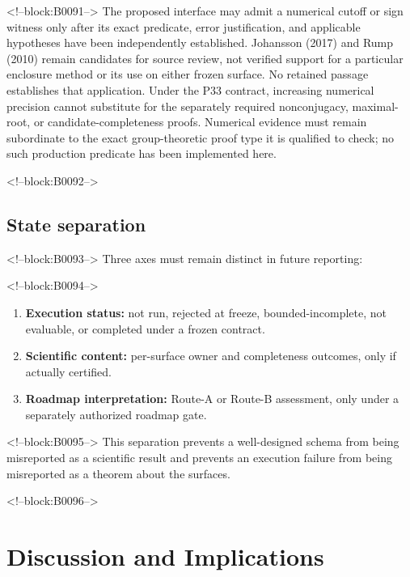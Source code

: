 \documentclass[11pt,a4paper]{article}
\providecommand{\tightlist}{\setlength{\itemsep}{0pt}\setlength{\parskip}{0pt}}
\begin{document}
<!--block:B0091-->
The proposed interface may admit a numerical cutoff or sign witness only after its exact predicate, error justification, and applicable hypotheses have been independently established. Johansson (2017)
\citep{P33-S17}
 and Rump (2010)
\citep{P33-S18}
 remain candidates for source review, not verified support for a particular enclosure method or its use on either frozen surface. No retained passage establishes that application. Under the P33 contract, increasing numerical precision cannot substitute for the separately required nonconjugacy, maximal-root, or candidate-completeness proofs. Numerical evidence must remain subordinate to the exact group-theoretic proof type it is qualified to check; no such production predicate has been implemented here.

<!--block:B0092-->
\hypertarget{state-separation}{%
\subsection{State separation}\label{state-separation}}

<!--block:B0093-->
Three axes must remain distinct in future reporting:

<!--block:B0094-->
\begin{enumerate}
\def\labelenumi{\arabic{enumi}.}
\tightlist
\item
  \textbf{Execution status:} not run, rejected at freeze, bounded-incomplete, not evaluable, or completed under a frozen contract.
\item
  \textbf{Scientific content:} per-surface owner and completeness outcomes, only if actually certified.
\item
  \textbf{Roadmap interpretation:} Route-A or Route-B assessment, only under a separately authorized roadmap gate.
\end{enumerate}

<!--block:B0095-->
This separation prevents a well-designed schema from being misreported as a scientific result and prevents an execution failure from being misreported as a theorem about the surfaces.

<!--block:B0096-->
\hypertarget{discussion-and-implications}{%
\section{Discussion and Implications}\label{discussion-and-implications}}
\end{document}

